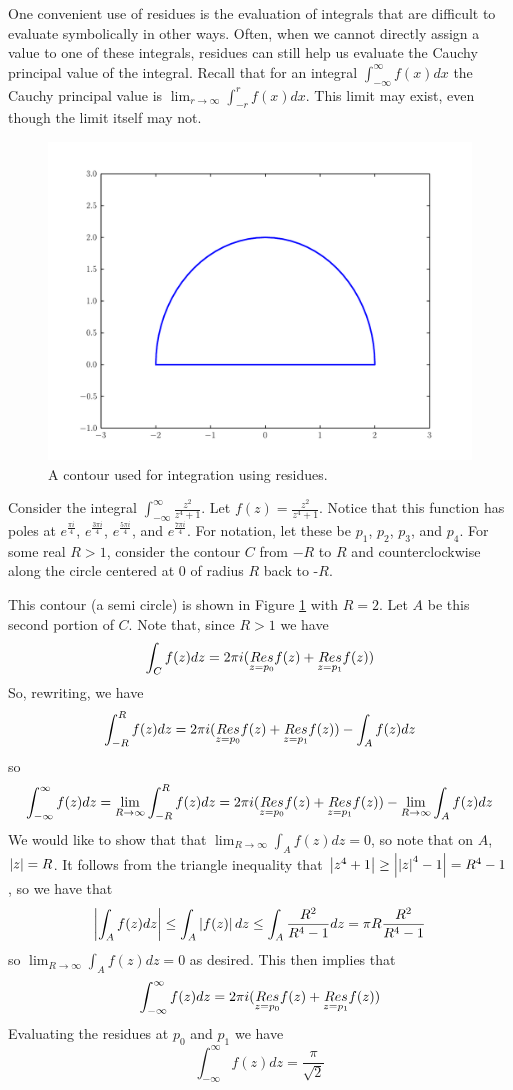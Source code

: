 One convenient use of residues is the evaluation of integrals that are difficult to evaluate symbolically in other ways.
Often, when we cannot directly assign a value to one of these integrals, residues can still help us evaluate the Cauchy principal value of the integral.
Recall that for an integral $\int_{-\infty}^{\infty} f(x)dx$ the Cauchy principal value is $\lim_{r\to \infty} \int_{-r}^{r} f(x) dx$.
This limit may exist, even though the limit itself may not.

\begin{figure}
\includegraphics[width=\textwidth]{contour1.pdf}
\caption{A contour used for integration using residues.}
\label{complexint:c1}
\end{figure}

Consider the integral $\int_{-\infty}^{\infty}\frac{z^2}{z^4+1}$. Let $f(z)=\frac{z^2}{z^4+1}$.
Notice that this function has poles at $e^{\frac{\pi i}{4}}$, $e^{\frac{3\pi i}{4}}$, $e^{\frac{5\pi i}{4}}$, and $e^{\frac{7\pi i}{4}}$.
For notation, let these be $p_1$, $p_2$, $p_3$, and $p_4$.
For some real $R>1$, consider the contour $C$ from $-R$ to $R$ and counterclockwise along the circle centered at $0$ of radius $R$ back to -$R$.

This contour (a semi circle) is shown in Figure \ref{complexint:c1} with $R = 2$.
Let $A$ be this second portion of $C$.
Note that, since $R>1$ we have
\[\int_C f(z)dz = 2\pi i (\underset{z=p_0}{Res} f(z) +\underset{z=p_1}{Res} f(z))\]
So, rewriting, we have
\[\int_{-R}^R f(z) dz = 2\pi i (\underset{z=p_0}{Res} f(z) +\underset{z=p_1}{Res} f(z)) - \int_A f(z) dz\]
so
\[\int_{-\infty}^{\infty} f(z) dz = \lim_{R\to \infty} \int_{-R}^R f(z) dz = 2\pi i (\underset{z=p_0}{Res} f(z) +\underset{z=p_1}{Res} f(z)) - \lim_{R\to \infty} \int_A f(z) dz\]
We would like to show that that $\lim_{R\to\infty} \int_A f(z) dz = 0$, so note that on $A$, $\left\lvert z\right\rvert=R$.
It follows from the triangle inequality that $\left\lvert z^4+1\right\rvert\geq \left\lvert\left\lvert z\right\rvert^4-1\right\rvert = R^4 -1$, so we have that
\[\left\lvert\int_A f(z) dz\right\rvert\leq \int_A \left\lvert f(z)\right\rvert dz \leq \int_A \frac{R^2}{R^4 -1}dz = \pi R \frac{R^2}{R^4-1}\]
so $\lim_{R\to\infty} \int_A f(z) dz = 0$ as desired.
This then implies that
\[\int_{-\infty}^{\infty} f(z) dz = 2\pi i (\underset{z=p_0}{Res} f(z) +\underset{z=p_1}{Res} f(z))\]
Evaluating the residues at $p_0$ and $p_1$ we have
\[\int_{-\infty}^{\infty} f(z) dz = \frac{\pi}{\sqrt{2}}\]

